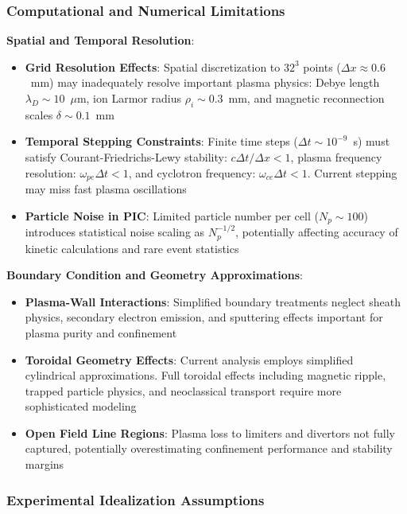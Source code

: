 \documentclass[10pt,twocolumn]{article}
\begin{document}
\subsubsection{Computational and Numerical Limitations}

\textbf{Spatial and Temporal Resolution}:
\begin{itemize}
\item \textbf{Grid Resolution Effects}: Spatial discretization to $32^3$ points ($\Delta x \approx 0.6$~mm) may inadequately resolve important plasma physics: Debye length $\lambda_D \sim 10$~$\mu$m, ion Larmor radius $\rho_i \sim 0.3$~mm, and magnetic reconnection scales $\delta \sim 0.1$~mm
\item \textbf{Temporal Stepping Constraints}: Finite time steps ($\Delta t \sim 10^{-9}$~s) must satisfy Courant-Friedrichs-Lewy stability: $c\Delta t/\Delta x < 1$, plasma frequency resolution: $\omega_{pe}\Delta t < 1$, and cyclotron frequency: $\omega_{ce}\Delta t < 1$. Current stepping may miss fast plasma oscillations
\item \textbf{Particle Noise in PIC}: Limited particle number per cell ($N_p \sim 100$) introduces statistical noise scaling as $N_p^{-1/2}$, potentially affecting accuracy of kinetic calculations and rare event statistics
\end{itemize}

\textbf{Boundary Condition and Geometry Approximations}:
\begin{itemize}
\item \textbf{Plasma-Wall Interactions}: Simplified boundary treatments neglect sheath physics, secondary electron emission, and sputtering effects important for plasma purity and confinement
\item \textbf{Toroidal Geometry Effects}: Current analysis employs simplified cylindrical approximations. Full toroidal effects including magnetic ripple, trapped particle physics, and neoclassical transport require more sophisticated modeling
\item \textbf{Open Field Line Regions}: Plasma loss to limiters and divertors not fully captured, potentially overestimating confinement performance and stability margins
\end{itemize}

\subsubsection{Experimental Idealization Assumptions}
\end{document}
